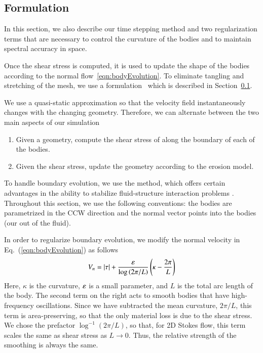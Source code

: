 \documentclass[preprint, 10pt]{elsarticle}
\begin{document}
\subsection{{\thL} Formulation} 
\label{sec:thetaL}

In this section, we also describe our time stepping method and two
regularization terms that are necessary to control the curvature of the
bodies and to maintain spectral accuracy in space.


Once the shear stress is computed, it is used to update the shape of the
bodies according to the normal flow~\eqref{eqn:bodyEvolution}.  To
eliminate tangling and stretching of the mesh, we use a {\thL}
formulation~\cite{hou-low-she1994} which is described in
Section~\ref{sec:thetaL}.




We use a quasi-static approximation so that the velocity field
instantaneously changes with the changing geometry.  Therefore, we can
alternate between the two main aspects of our simulation
\begin{enumerate}
  \item Given a geometry, compute the shear stress of along the boundary
    of each of the bodies.
  \item Given the shear stress, update the geometry according to the
    erosion model.
\end{enumerate}

To handle boundary evolution, we use the {\thL}    method, which offers
certain advantages in the ability to stabilize fluid-structure
interaction problems \cite{hou-low-she1994}. Throughout this section, we
use the following conventions: the bodies are parametrized in the CCW
direction and the normal vector points into the bodies (our out of the
fluid).

In order to regularize boundary evolution, we modify the normal velocity
in Eq.~(\ref{eqn:bodyEvolution}) as follows
\begin{equation}
\label{eqn:Vn}
V_n = \lvert \tau \rvert + \frac{\varepsilon}{\log \left(2\pi/L \right)} \left(\kappa - \frac{2 \pi}{L} \right)
\end{equation}
Here, $\kappa$ is the curvature, $\varepsilon$ is a small parameter, and $L$ is the total arc length of the body. The second term on the right acts to smooth bodies that have high-frequency oscillations. Since we have subtracted the mean curvature, $2\pi/L$, this term is area-preserving, so that the only material loss is due to the shear stress. We chose the prefactor $\log^{-1} \left(2\pi/L \right)$, so that, for 2D Stokes flow, this term scales the same as shear stress as $L \to 0$. Thus, the relative strength of the smoothing is always the same. 
\end{document}
